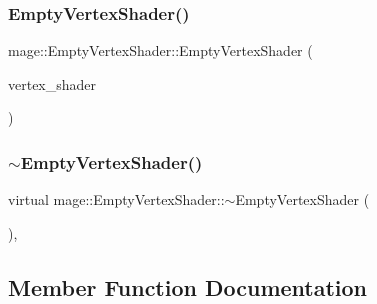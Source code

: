 \hypertarget{classmage_1_1_empty_vertex_shader_a04d905fda6f77338521746fee50e6bf7}{}\label{classmage_1_1_empty_vertex_shader_a04d905fda6f77338521746fee50e6bf7} 
\subsubsection{\texorpdfstring{Empty\+Vertex\+Shader()}{EmptyVertexShader()}\hspace{0.1cm}{\footnotesize\ttfamily [3/3]}}
{\footnotesize\ttfamily mage\+::\+Empty\+Vertex\+Shader\+::\+Empty\+Vertex\+Shader (\begin{DoxyParamCaption}\item[{\hyperlink{classmage_1_1_empty_vertex_shader}{Empty\+Vertex\+Shader} \&\&}]{vertex\+\_\+shader }\end{DoxyParamCaption})\hspace{0.3cm}{\ttfamily [default]}}

\hypertarget{classmage_1_1_empty_vertex_shader_a321ef00a2087030b81713e989ab02306}{}\label{classmage_1_1_empty_vertex_shader_a321ef00a2087030b81713e989ab02306} 
\subsubsection{\texorpdfstring{$\sim$\+Empty\+Vertex\+Shader()}{~EmptyVertexShader()}}
{\footnotesize\ttfamily virtual mage\+::\+Empty\+Vertex\+Shader\+::$\sim$\+Empty\+Vertex\+Shader (\begin{DoxyParamCaption}{ }\end{DoxyParamCaption})\hspace{0.3cm}{\ttfamily [virtual]}, {\ttfamily [default]}}



\subsection{Member Function Documentation}
\hypertarget{classmage_1_1_empty_vertex_shader_a2683d29127405d51737008637ebde098}{}\label{classmage_1_1_empty_vertex_shader_a2683d29127405d51737008637ebde098} 
